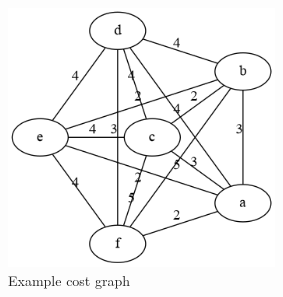 \begin{figure}[H]
    \centering
    \includegraphics[width=200pt]{images/forest-example-cost.png}
    \caption{Example cost graph}\label{fig:forest_cost_graph}
\end{figure}
